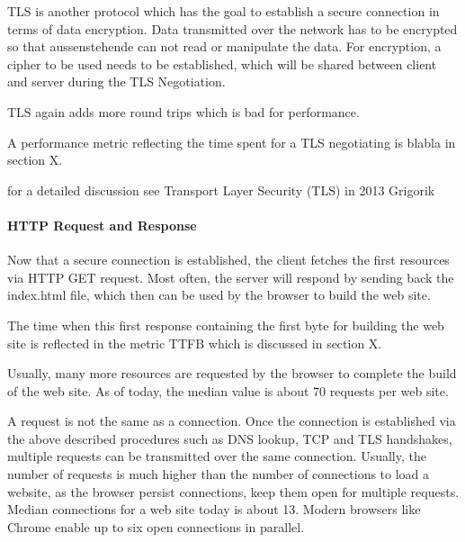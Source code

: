 TLS is another protocol which has the goal to establish a secure connection in terms of data encryption.
Data transmitted over the network has to be encrypted so that aussenstehende can not read or manipulate the data.
For encryption,  a cipher to be used needs to be established, which will be shared between client and server during the TLS Negotiation. %

TLS again adds more round trips which is bad for performance.

A performance metric reflecting the time spent for a TLS negotiating is blabla in section X.

for a detailed discussion see Transport Layer Security (TLS) in 2013 Grigorik %




\paragraph{HTTP Request and Response}

Now that a secure connection is established, the client fetches the first resources via HTTP GET request.
Most often, the server will respond by sending back the index.html file, which then can be used by the browser to build the web site. %

The time when this first response containing the first byte for building the web site is reflected in the metric TTFB which is discussed in section X.



Usually, many more resources are requested by the browser to complete the build of the web site.
As of today, the median value is about 70 requests per web site. %

A request is not the same as a connection.
Once the connection is established via the above described procedures such as DNS lookup, TCP and TLS handshakes, multiple requests can be transmitted over the same connection.
Usually, the number of requests is much higher than the number of connections to load a website, as the browser persist connections, keep them open for multiple requests.
Median connections for a web site today is about 13. %
Modern browsers like Chrome enable up to six open connections in parallel. %



